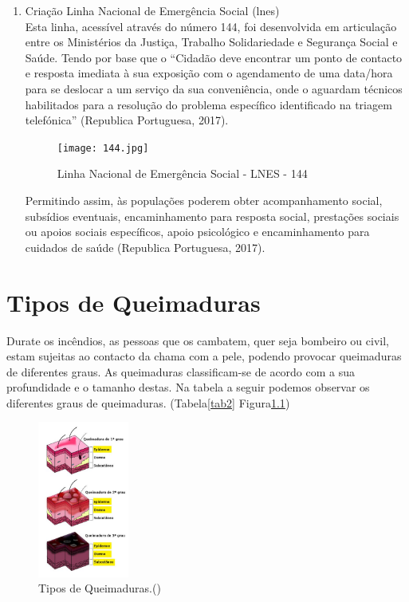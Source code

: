 \documentclass{report}
\begin{document}
\begin{enumerate}
\begin{itemize}
 \end{itemize}
 
 \item Criação Linha Nacional de Emergência Social (\ac{lnes})\\
  Esta linha, acessível através do número 144, foi desenvolvida em articulação entre os Ministérios da Justiça, Trabalho Solidariedade e Segurança Social e Saúde. Tendo por base que o “Cidadão deve encontrar um ponto de contacto e resposta imediata à sua exposição com o agendamento de uma data/hora para se deslocar a um serviço da sua conveniência, onde o aguardam técnicos habilitados para a resolução do problema específico identificado na triagem telefónica” (Republica Portuguesa, 2017).
  
\begin{figure}[H]
\center
\texttt{[image: 144.jpg]}
\caption{Linha Nacional de Emergência Social - LNES - 144}
\label{agua}
\end{figure}  
  
Permitindo assim, às populações poderem obter acompanhamento social, subsídios eventuais, encaminhamento para resposta social, prestações sociais ou apoios sociais específicos, apoio psicológico e encaminhamento para cuidados de saúde (Republica Portuguesa, 2017).


 \end{enumerate}

 
\chapter{Tipos de Queimaduras} 
\label{tipos de queimaduras}
\cite{dgsriscos}

Durate os incêndios, as pessoas que os cambatem, quer seja bombeiro ou civil,  estam sujeitas ao contacto da chama com a pele, podendo provocar queimaduras de diferentes graus.
As queimaduras classificam-se de acordo com a sua profundidade e o tamanho destas.
Na tabela a seguir podemos observar os diferentes graus de queimaduras. (Tabela\ref{tab2}  Figura\ref{queimaduras})

\begin{figure}[H]
\center
\includegraphics[width=3cm]{queimaduras.jpg}
\caption{Tipos de Queimaduras.(\cite{fquei})}
\label{queimaduras}
\end{figure}
\end{document}
